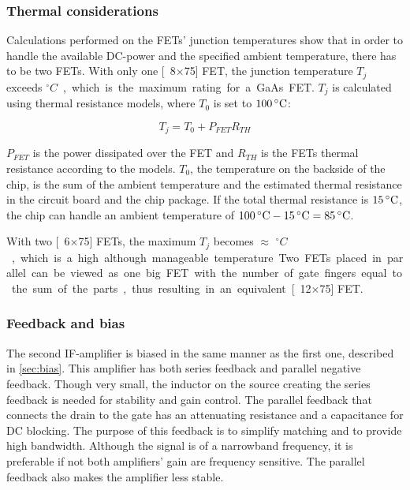 			\subsubsection{Thermal considerations}
				Calculations performed on the FETs' junction temperatures show that in order to handle the available DC-power and the specified ambient temperature, there has to be two FETs. With only one \unit[8$\times$75]{\mum} FET, the junction temperature $T_j$ exceeds \unit[170]{$^\circ C$}, which is the maximum rating for a GaAs FET. $T_j$ is calculated using thermal resistance models\autocite{fukui80}, where $T_0$ is set to $\unit[100]{^\circ C}$:

				\begin{equation}
					T_j=T_0+P_{FET}R_{TH}
				\end{equation}

				$P_{FET}$ is the power dissipated over the FET and $R_{TH}$ is the FETs thermal resistance according to the models. $T_0$, the temperature on the backside of the chip, is the sum of the ambient temperature and the estimated thermal resistance in the circuit board and the chip package. If the total thermal resistance is $\unit[15]{^\circ C}$, the chip can handle an ambient temperature of $\unit[100]{^\circ C}-\unit[15]{^\circ C}=\unit[85]{^\circ C}$.

				With two \unit[6$\times$75]{\mum} FETs, the maximum $T_j$ becomes $\approx$ \unit[150]{$^\circ C$}, which is a high although manageable temperature. Two FETs placed in parallel can be viewed as one big FET with the number of gate fingers equal to the sum of the parts, thus resulting in an equivalent \unit[12$\times$75]{\mum} FET.

			\subsubsection{Feedback and bias}
				The second IF-amplifier is biased in the same manner as the first one, described in \autoref{sec:bias}. This amplifier has both series feedback and parallel negative feedback. Though very small, the inductor on the source creating the series feedback is needed for stability and gain control. The parallel feedback that connects the drain to the gate has an attenuating resistance and a capacitance for DC blocking. The purpose of this feedback is to simplify matching and to provide high bandwidth. Although the signal is of a narrowband frequency, it is preferable if not both amplifiers' gain are frequency sensitive. The parallel feedback also makes the amplifier less stable.

